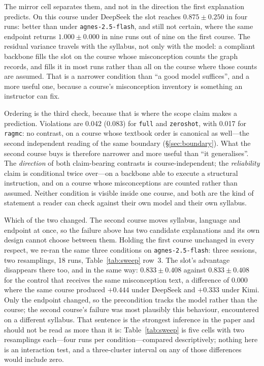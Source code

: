 \documentclass[review,12pt]{elsarticle}
\renewcommand{\_}{\kgunderscore\allowbreak}
\newcommand{\id}[1]{\texttt{#1}}
\begin{document}
The mirror cell separates them, and not in the direction the first explanation
predicts. On this course under DeepSeek the slot reaches $0.875 \pm 0.250$ in
four runs: better than under \id{agnes-2.5-flash}, and still not certain, where
the same endpoint returns $1.000 \pm 0.000$ in nine runs out of nine on the
first course. The residual variance travels with the syllabus, not only
with the model: a compliant backbone fills the slot on the course whose
misconception counts the graph records, and fills it in most runs rather than
all on the course where those counts are assumed. That is a narrower condition
than ``a good model suffices'', and a more useful one, because a course's
misconception inventory is something an instructor can fix.

Ordering is the third check, because that is where the scope claim makes a
prediction. Violations are 0.042 (0.083) for \id{full} and \id{zero\_shot},
with 0.017 for \id{rag\_mc}: no contrast, on a course whose textbook order is
canonical as well---the second independent reading of the same boundary
(\S\ref{sec:boundary}). What the second course buys is therefore narrower and
more useful than ``it generalises''. The \emph{direction} of both claim-bearing
contrasts is course-independent; the \emph{reliability} claim is conditional
twice over---on a backbone able to execute a structural instruction, and on a
course whose misconceptions are counted rather than assumed. Neither condition
is visible inside one course, and both are the kind of statement a reader can
check against their own model and their own syllabus.

Which of the two changed. The second course moves syllabus, language
and endpoint at once, so the failure above has two candidate explanations and
its own design cannot choose between them. Holding the first course unchanged
in every respect, we re-ran the same three conditions on
\id{agnes-2.5-flash}: three sessions, two resamplings, 18 runs,
Table~\ref{tab:sweep} row~3. The slot's advantage disappears there too, and in
the same way: $0.833 \pm 0.408$ against $0.833 \pm 0.408$ for the control that
receives the same misconception text, a difference of $0.000$ where the same
course produced $+0.444$ under DeepSeek and $+0.333$ under Kimi. Only the
endpoint changed, so the precondition tracks the model rather than the
course; the second course's failure was most plausibly this behaviour,
encountered on a different syllabus. That sentence is the strongest inference
in the paper and should not be read as more than it is:
Table~\ref{tab:sweep} is five cells with two resamplings each---four runs per
condition---compared descriptively; nothing here is an interaction test, and a
three-cluster interval on any of those differences would include zero.
\end{document}

